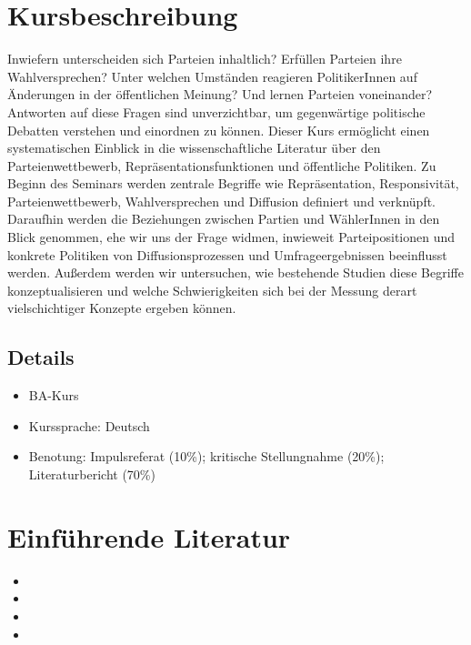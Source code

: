 \documentclass[abstract=on,parskip=full,headings=standardclasses,fontsize=11pt,paper=a4]{scrartcl}
\begin{document}
\section*{Kursbeschreibung}

Inwiefern unterscheiden sich Parteien inhaltlich? Erfüllen Parteien ihre Wahlversprechen? Unter welchen Umständen reagieren PolitikerInnen auf Änderungen in der öffentlichen Meinung? Und lernen Parteien voneinander? Antworten auf diese Fragen sind unverzichtbar, um gegenwärtige politische Debatten verstehen und einordnen zu können. Dieser Kurs ermöglicht einen systematischen Einblick in die wissenschaftliche Literatur über den Parteienwettbewerb, Repräsentationsfunktionen und öffentliche Politiken. Zu Beginn des Seminars werden zentrale Begriffe wie Repräsentation, Responsivität, Parteienwettbewerb, Wahlversprechen und Diffusion definiert und verknüpft. Daraufhin werden die Beziehungen zwischen Partien und WählerInnen in den Blick genommen, ehe wir uns der Frage widmen, inwieweit Parteipositionen und konkrete Politiken von Diffusionsprozessen und Umfrageergebnissen beeinflusst werden. Außerdem werden wir untersuchen, wie bestehende Studien diese Begriffe konzeptualisieren und welche Schwierigkeiten sich bei der Messung derart vielschichtiger Konzepte ergeben können.

\subsection*{Details}

\begin{itemize}
\item BA-Kurs
\item  Kurssprache: Deutsch
\item Benotung: Impulsreferat (10\%); kritische Stellungnahme (20\%); Literaturbericht (70\%)
\end{itemize}



\section*{Einführende Literatur}

\begin{itemize}
\item {}
\item {}
\item {}
\item {}
\end{itemize}
\end{document}
